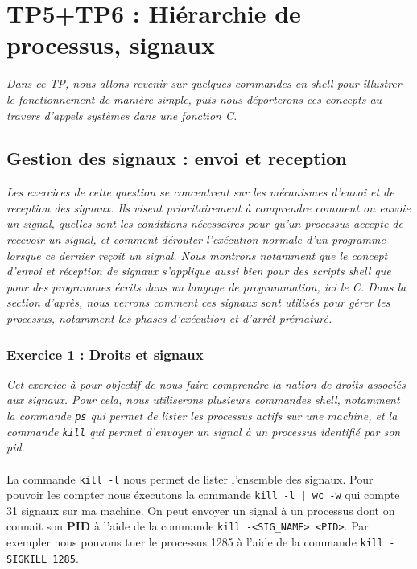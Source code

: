 \chapter{TP5+TP6 : Hiérarchie de processus, signaux}
\textit{Dans ce TP, nous allons revenir sur quelques commandes en shell pour illustrer le fonctionnement de manière simple, puis nous déporterons ces concepts au travers d’appels systèmes dans une fonction C.}

\section{Gestion des signaux : envoi et reception}
\textit{Les exercices de cette question se concentrent sur les mécanismes d’envoi et de reception des signaux. Ils visent prioritairement à comprendre comment on envoie un signal, quelles sont les conditions nécessaires pour qu’un processus accepte de recevoir un signal, et comment dérouter l’exécution normale d’un programme lorsque ce dernier reçoit un signal. Nous montrons notamment que le concept d’envoi et réception de signaux s’applique aussi bien pour des scripts shell que pour des programmes écrits dans un langage de programmation, ici le C. Dans la section d’après, nous verrons comment ces signaux sont utilisés pour gérer les processus, notamment les phases d’exécution et d’arrêt prématuré.}
\subsection{Exercice 1 : Droits et signaux}
\textit{Cet exercice à pour objectif de nous faire comprendre la nation de droits associés aux signaux. Pour cela, nous utiliserons plusieurs commandes shell, notamment la commande \texttt{ps} qui permet de lister les processus actifs sur une machine, et la commande \texttt{kill} qui permet d’envoyer un signal à un processus identifié par son pid.}
\\\\
La commande \texttt{kill -l} nous permet de lister l'ensemble des signaux. Pour pouvoir les compter nous éxecutons la commande \texttt{kill -l | wc -w} qui compte 31 signaux sur ma machine. On peut envoyer un signal à un processus dont on connait son \textbf{PID} à l'aide de la commande \texttt{kill -<SIG_NAME> <PID>}. Par exempler nous pouvons tuer le processus 1285 à l'aide de la commande \texttt{kill -SIGKILL 1285}.

